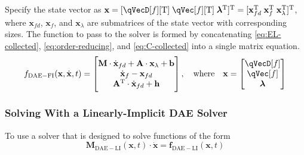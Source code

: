 \documentclass[11pt]{article}
\begin{document}
Specify the state vector as $\mathbf{x} = [\qVecD[f][\mathrm{T}] \; \qVec[f][\mathrm{T}] \; \bm{\lambda}^{\mathrm{T}}]^{\mathrm{T}}=[\mathbf{x}_{fd}^\mathrm{T} \; \mathbf{x}_{f}^\mathrm{T} \; \mathbf{x}_{\lambda}^{\mathrm{T}}]^{\mathrm{T}}$, where $\mathbf{x}_{fd}$, $\mathbf{x}_{f}$, and $\mathbf{x}_{\lambda}$ are submatrices of the state vector with corresponding sizes. The function to pass to the solver is formed by concatenating \eqref{eq:EL-collected}, \eqref{eq:order-reducing}, and \eqref{eq:C-collected} into a single matrix equation.
\begin{equation}
    f_{\mathrm{DAE-FI}}(\mathbf{x},\dot{\mathbf{x}},t) =
    \begin{bmatrix}
        \mathbf{M} \cdot \dot{\mathbf{x}}_{fd} + \mathbf{A} \cdot \mathbf{x}_{\lambda} + \mathbf{b} \\
        \dot{\mathbf{x}}_{f} - \mathbf{x}_{fd} \\
        \mathbf{A}^{\mathrm{T}} \cdot \dot{\mathbf{x}}_{fd} + \mathbf{h}
    \end{bmatrix}
    ,\quad \mathrm{where} \quad
    \mathbf{x} = \begin{bmatrix} \qVecD[f] \\ \qVec[f] \\ \bm{\lambda} \end{bmatrix}
\end{equation}


\subsubsection{Solving With a Linearly-Implicit DAE Solver} \label{sssec:d:fwdDyn:DAE-linearly-implicit}
To use a solver that is designed to solve functions of the form
\begin{equation}
    \mathbf{M}_{\mathrm{DAE-LI}}(\mathbf{x},t) \cdot \dot{\mathbf{x}} = \mathbf{f}_{\mathrm{DAE-LI}}(\mathbf{x},t)
\end{equation}
\end{document}
